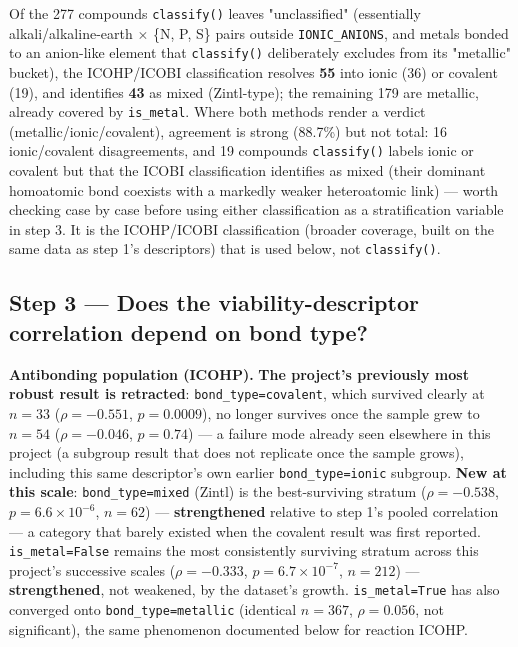 \documentclass[11pt,a4paper]{article}
\begin{document}
Of the 277 compounds \texttt{classify()} leaves "unclassified"
(essentially alkali/alkaline-earth $\times$ \{N, P, S\} pairs outside
\texttt{IONIC\_ANIONS}, and metals bonded to an anion-like element that
\texttt{classify()} deliberately excludes from its "metallic" bucket),
the ICOHP/ICOBI classification resolves \textbf{55} into ionic (36) or
covalent (19), and identifies \textbf{43} as mixed (Zintl-type); the
remaining 179 are metallic, already covered by \texttt{is\_metal}.
Where both methods render a verdict (metallic/ionic/covalent), agreement
is strong (88.7\%) but not total: 16 ionic/covalent disagreements, and
19 compounds \texttt{classify()} labels ionic or covalent but that the
ICOBI classification identifies as mixed (their dominant homoatomic
bond coexists with a markedly weaker heteroatomic link) --- worth
checking case by case before using either classification as a
stratification variable in step 3. It is the ICOHP/ICOBI classification
(broader coverage, built on the same data as step 1's descriptors) that
is used below, not \texttt{classify()}.

\subsection{Step 3 --- Does the viability-descriptor correlation depend on bond type?}
\label{sec:stratification}

\textbf{Antibonding population (ICOHP).} \textbf{The project's previously
most robust result is retracted}: \texttt{bond\_type=covalent}, which
survived clearly at $n=33$ ($\rho=-0.551$, $p=0.0009$), no longer
survives once the sample grew to $n=54$ ($\rho=-0.046$, $p=0.74$) --- a
failure mode already seen elsewhere in this project (a subgroup result
that does not replicate once the sample grows), including this same
descriptor's own earlier \texttt{bond\_type=ionic} subgroup.
\textbf{New at this scale}: \texttt{bond\_type=mixed} (Zintl) is the
best-surviving stratum ($\rho=-0.538$, $p=6.6\times10^{-6}$, $n=62$) ---
\textbf{strengthened} relative to step 1's pooled correlation --- a
category that barely existed when the covalent result was first
reported. \texttt{is\_metal=False} remains the most consistently
surviving stratum across this project's successive scales
($\rho=-0.333$, $p=6.7\times10^{-7}$, $n=212$) --- \textbf{strengthened},
not weakened, by the dataset's growth. \texttt{is\_metal=True} has also
converged onto \texttt{bond\_type=metallic} (identical $n=367$,
$\rho=0.056$, not significant), the same phenomenon documented below
for reaction ICOHP.
\end{document}

